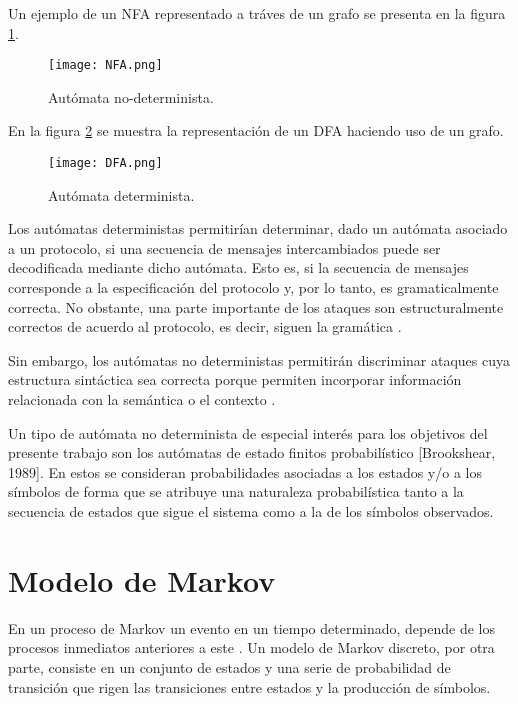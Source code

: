 Un ejemplo de un NFA representado a tráves de un grafo se presenta en la figura \ref{fig:NFA}.

\begin{figure}[H]
\begin{center}
\texttt{[image: NFA.png]}
\caption{Autómata no-determinista.\cite{automataFinito}}
\label{fig:NFA}
\end{center}
\end{figure}

En la figura \ref{fig:DFA} se muestra la representación de un DFA haciendo uso de un grafo.

\begin{figure}[H]
\begin{center}
\texttt{[image: DFA.png]}
\caption{Autómata determinista.\cite{automataFinito}}
\label{fig:DFA}
\end{center}
\end{figure}

Los autómatas deterministas permitirían determinar, dado un autómata asociado a un protocolo, si una secuencia de mensajes intercambiados puede ser decodificada mediante dicho autómata. Esto es, si la secuencia de mensajes corresponde a la especificación del protocolo y, por lo tanto, es gramaticalmente correcta. No obstante, una parte importante de los ataques son estructuralmente correctos de acuerdo al protocolo, es decir, siguen la gramática \cite{tesisMexico}.

Sin embargo, los autómatas no deterministas permitirán discriminar ataques cuya estructura sintáctica sea correcta porque permiten incorporar información relacionada con la semántica o el contexto .

Un tipo de autómata no determinista de especial interés para los objetivos del presente trabajo son los autómatas de estado finitos probabilístico [Brookshear, 1989]. En estos se consideran probabilidades asociadas a los estados y/o a los símbolos de forma que se atribuye una naturaleza probabilística tanto a la secuencia de estados que sigue el sistema como a la de los símbolos observados.


\section{Modelo de Markov}

En un proceso de Markov un evento en un tiempo determinado, depende de los procesos inmediatos anteriores a este \cite{markov}. Un modelo de Markov discreto, por otra parte, consiste en un conjunto de estados y una serie de probabilidad de transición que rigen las transiciones entre estados y la producción de símbolos.

